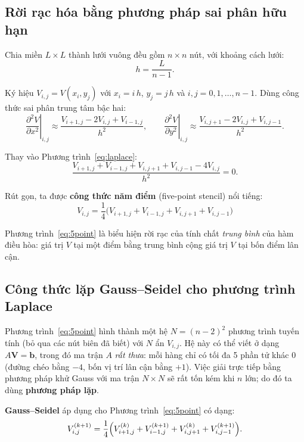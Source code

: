 \documentclass[12pt,a4paper]{article}
\begin{document}
\subsection{Rời rạc hóa bằng phương pháp sai phân hữu hạn}

Chia miền $L\times L$ thành lưới vuông đều gồm $n\times n$ nút, với khoảng cách lưới:
\[
    h = \frac{L}{n-1}.
\]

Ký hiệu $V_{i,j} = V(x_i, y_j)$ với $x_i = i\,h$, $y_j = j\,h$ và $i,j = 0,1,\dots,n-1$. Dùng công thức sai phân trung tâm bậc hai:
\begin{equation}
    \left.\frac{\partial^2 V}{\partial x^2}\right|_{i,j}
    \approx \frac{V_{i+1,j} - 2V_{i,j} + V_{i-1,j}}{h^2}, \qquad
    \left.\frac{\partial^2 V}{\partial y^2}\right|_{i,j}
    \approx \frac{V_{i,j+1} - 2V_{i,j} + V_{i,j-1}}{h^2}.
    \label{eq:centralDiff}
\end{equation}

Thay vào Phương trình~\eqref{eq:laplace}:
\[
    \frac{V_{i+1,j} + V_{i-1,j} + V_{i,j+1} + V_{i,j-1} - 4V_{i,j}}{h^2} = 0.
\]

Rút gọn, ta được \textbf{công thức năm điểm} (five-point stencil) nổi tiếng:
\begin{equation}
    \boxed{\; V_{i,j} = \frac{1}{4}\bigl(V_{i+1,j} + V_{i-1,j} + V_{i,j+1} + V_{i,j-1}\bigr) \;}
    \label{eq:5point}
\end{equation}

Phương trình~\eqref{eq:5point} là biểu hiện rời rạc của tính chất \emph{trung bình} của hàm điều hòa: giá trị $V$ tại một điểm bằng trung bình cộng giá trị $V$ tại bốn điểm lân cận.

\subsection{Công thức lặp Gauss--Seidel cho phương trình Laplace}

Phương trình~\eqref{eq:5point} hình thành một hệ $N = (n-2)^2$ phương trình tuyến tính (bỏ qua các nút biên đã biết) với $N$ ẩn $V_{i,j}$. Hệ này có thể viết ở dạng $A\mathbf{V} = \mathbf{b}$, trong đó ma trận $A$ \emph{rất thưa}: mỗi hàng chỉ có tối đa 5 phần tử khác 0 (đường chéo bằng $-4$, bốn vị trí lân cận bằng $+1$). Việc giải trực tiếp bằng phương pháp khử Gauss với ma trận $N\times N$ sẽ rất tốn kém khi $n$ lớn; do đó ta dùng \textbf{phương pháp lặp}.

\textbf{Gauss--Seidel} áp dụng cho Phương trình~\eqref{eq:5point} có dạng:
\begin{equation}
    V_{i,j}^{(k+1)} = \frac{1}{4}\Bigl(V_{i+1,j}^{(k)} + V_{i-1,j}^{(k+1)} + V_{i,j+1}^{(k)} + V_{i,j-1}^{(k+1)}\Bigr).
    \label{eq:GS_laplace}
\end{equation}
\end{document}
